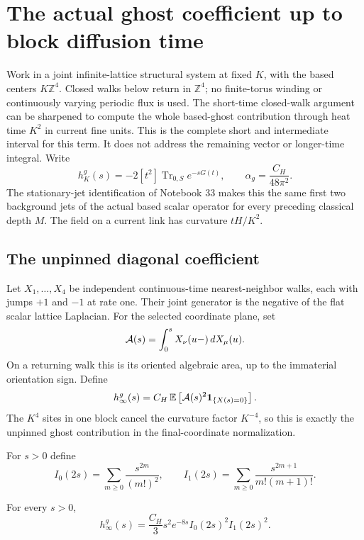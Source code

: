 \section{The actual ghost coefficient up to block diffusion time}
\label{pgp-section}

Work in a joint infinite-lattice structural system at fixed
\(K\), with the based centers \(K\mathbb Z^4\). Closed walks
below return in \(\mathbb Z^4\); no finite-torus winding
or continuously varying periodic flux is used.
The short-time closed-walk argument can be sharpened to
compute the whole based-ghost contribution through heat
time \(K^2\) in current fine units. This is the complete
short and intermediate interval for this term. It does
not address the remaining vector or longer-time integral.
Write
\[
 h_K^g(s)=-2[t^2]\operatorname{Tr}_{0,S}e^{-sG(t)},\qquad
 \alpha_g=\frac{C_H}{48\pi^2}.
\]
The stationary-jet identification of Notebook 33 makes
this the same first two background jets of the actual
based scalar operator for every
preceding classical depth \(M\). The field on a current
link has curvature \(tH/K^2\).

\subsection{The unpinned diagonal coefficient}
\label{pgp-unpinned-section}

Let \(X_1,\ldots,X_4\) be independent continuous-time
nearest-neighbor walks, each with jumps \(+1\) and
\(-1\) at rate one. Their joint generator is the
negative of the flat scalar lattice Laplacian.
For the selected coordinate plane, set
\[
 {\cal A}(s)=\int_0^s X_\nu(u-)\,dX_\mu(u).
\]
On a returning walk this is its oriented algebraic
area, up to the immaterial orientation sign. Define
\begin{equation}
 h_\infty^g(s)
   =C_H\,\mathbb E\left[{\cal A}(s)^2
                       {\bf1}_{\{X(s)=0\}}\right].
 \label{pgp-unpinned-definition}
\end{equation}
The \(K^4\) sites in one block cancel the curvature
factor \(K^{-4}\), so this is exactly the unpinned
ghost contribution in the final-coordinate normalization.

For \(s>0\) define
\[
 I_0(2s)=\sum_{m\ge0}\frac{s^{2m}}{(m!)^2},\qquad
 I_1(2s)=\sum_{m\ge0}\frac{s^{2m+1}}{m!(m+1)!}.
\]

\begin{proposition}
\label{pgp-exact-heat}
For every \(s>0\),
\begin{equation}
 h_\infty^g(s)=\frac{C_H}{3}s^2e^{-8s}
                                  I_0(2s)^2I_1(2s)^2.
 \label{pgp-bessel}
\end{equation}
\end{proposition}

